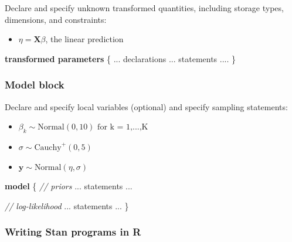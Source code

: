 \documentclass[
  11pt,
]{article}
\newenvironment{Shaded}{\begin{snugshade}}{\end{snugshade}}
\newcommand{\CommentTok}[1]{\textcolor[rgb]{0.56,0.35,0.01}{\textit{#1}}}
\newcommand{\KeywordTok}[1]{\textcolor[rgb]{0.13,0.29,0.53}{\textbf{#1}}}
\newcommand{\NormalTok}[1]{#1}
\providecommand{\tightlist}{%
  \setlength{\itemsep}{0pt}\setlength{\parskip}{0pt}}
\begin{document}
Declare and specify unknown transformed quantities, including storage types, dimensions, and constraints:

\begin{itemize}
\tightlist
\item
  \(\eta = \mathbf{X} \beta\), the linear prediction
\end{itemize}

\begin{Shaded}
\begin{Highlighting}[]
\KeywordTok{transformed parameters}\NormalTok{ \{}
\NormalTok{  ... declarations ... statements ....}
\NormalTok{\}}
\end{Highlighting}
\end{Shaded}

\hypertarget{model-block}{%
\subsubsection{Model block}\label{model-block}}

Declare and specify local variables (optional) and specify sampling statements:

\begin{itemize}
\tightlist
\item
  \(\beta_k \sim \text{Normal}(0, 10) \text{ for k = 1,...,K}\)
\item
  \(\sigma \sim \text{Cauchy}^{+}(0, 5)\)
\item
  \(\mathbf{y} \sim \text{Normal}(\eta, \sigma)\)
\end{itemize}

\begin{Shaded}
\begin{Highlighting}[]
\KeywordTok{model}\NormalTok{ \{}
  \CommentTok{// priors}
\NormalTok{  ... statements ...}
  
  \CommentTok{// log{-}likelihood}
\NormalTok{  ... statements ...}
\NormalTok{\}}
\end{Highlighting}
\end{Shaded}

\hypertarget{writing-stan-programs-in-r}{%
\subsubsection{Writing Stan programs in R}\label{writing-stan-programs-in-r}}
\end{document}
